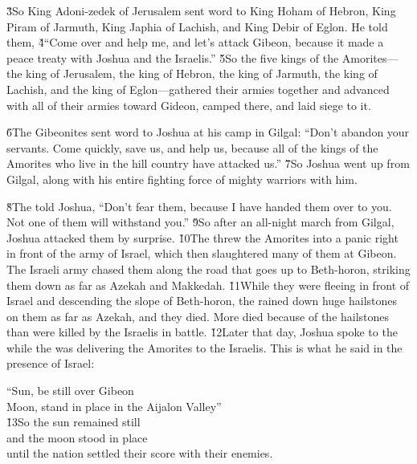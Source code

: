 \v{3}So King Adoni-zedek of Jerusalem sent word to King Hoham of Hebron, King Piram of Jarmuth, King Japhia of Lachish, and King Debir of Eglon. He told them, \v{4}``Come over and help me, and let's attack Gibeon, because it made a peace treaty with Joshua and the Israelis.'' \v{5}So the five kings of the Amorites---the king of Jerusalem, the king of Hebron, the king of Jarmuth, the king of Lachish, and the king of Eglon---gathered their armies together and advanced with all of their armies toward Gideon, camped there, and laid siege to it.

\v{6}The Gibeonites sent word to Joshua at his camp in Gilgal: ``Don't abandon your servants. Come quickly, save us, and help us, because all of the kings of the Amorites who live in the hill country have attacked us.'' \v{7}So Joshua went up from Gilgal, along with his entire fighting force of mighty warriors with him.

\v{8}The  told Joshua, ``Don't fear them, because I have handed them over to you. Not one of them will withstand you.'' \v{9}So after an all-night march from Gilgal, Joshua attacked them by surprise. \v{10}The  threw the Amorites into a panic right in front of the army of Israel, which then slaughtered many of them at Gibeon. The Israeli army chased them along the road that goes up to Beth-horon, striking them down as far as Azekah and Makkedah. \v{11}While they were fleeing in front of Israel and descending the slope of Beth-horon, the  rained down huge hailstones on them as far as Azekah, and they died. More died because of the hailstones than were killed by the Israelis in battle. \v{12}Later that day, Joshua spoke to the  while the  was delivering the Amorites to the Israelis. This is what he said in the presence of Israel:

\begin{poetry}
\poeml ``Sun, be still over Gibeon \\
\poemll    Moon, stand in place in the Aijalon Valley'' \\
\poeml \v{13}So the sun remained still \\
\poemll    and the moon stood in place \\
\poemlll       until the nation settled their score with their enemies.
\end{poetry}

